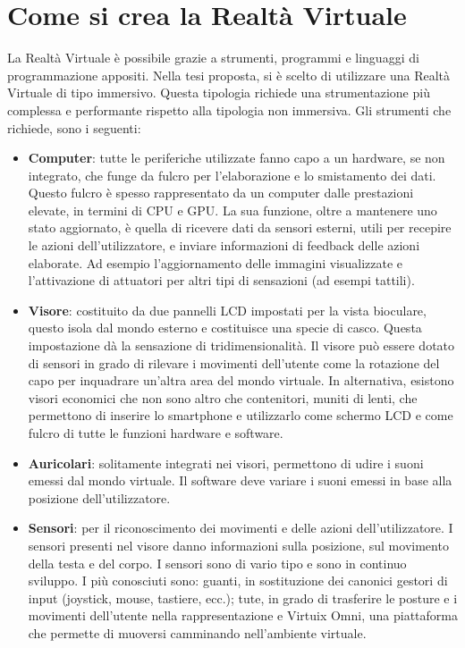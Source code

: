 \section{Come si crea la Realtà Virtuale}
La Realtà Virtuale è possibile grazie a strumenti, programmi e linguaggi di programmazione appositi. Nella tesi proposta, si è scelto di utilizzare una Realtà Virtuale di tipo immersivo. Questa tipologia richiede una strumentazione più complessa e performante rispetto alla tipologia non immersiva. Gli strumenti che richiede, sono i seguenti:
\begin{itemize}
  \item \textbf{Computer}: tutte le periferiche utilizzate fanno capo a un hardware, se non integrato, che funge da fulcro per l’elaborazione e lo smistamento dei dati. Questo fulcro è spesso rappresentato da un computer dalle prestazioni elevate, in termini di CPU e GPU. La sua funzione, oltre a mantenere uno stato aggiornato, è quella di ricevere dati da sensori esterni, utili per recepire le azioni dell’utilizzatore, e inviare informazioni di feedback delle azioni elaborate. Ad esempio l’aggiornamento delle immagini visualizzate e l’attivazione di attuatori per altri tipi di sensazioni (ad esempi tattili).
	\item\textbf{Visore}: costituito da due pannelli LCD impostati per la vista bioculare, questo isola dal mondo esterno e costituisce una specie di casco. Questa impostazione dà la sensazione di tridimensionalità. Il visore può essere dotato di sensori in grado di rilevare i movimenti dell’utente come la rotazione del capo per inquadrare un’altra area del mondo virtuale. In alternativa, esistono visori economici che non sono altro che contenitori, muniti di lenti, che permettono di inserire lo smartphone e utilizzarlo come schermo LCD e come fulcro di tutte le funzioni hardware e software.
  \item \textbf{Auricolari}: solitamente integrati nei visori, permettono di udire i suoni emessi dal mondo virtuale. Il software deve variare i suoni emessi in base alla posizione dell'utilizzatore.
  \item \textbf{Sensori}: per il riconoscimento dei movimenti e delle azioni dell'utilizzatore. I sensori presenti nel visore danno informazioni sulla posizione, sul movimento della testa e del corpo. I sensori sono di vario tipo e sono in continuo sviluppo. I più conosciuti sono: guanti, in sostituzione dei canonici gestori di input (joystick, mouse, tastiere, ecc.); tute, in grado di trasferire le posture e i movimenti dell’utente nella rappresentazione e Virtuix Omni, una piattaforma che permette di muoversi camminando nell’ambiente virtuale.
\end{itemize}